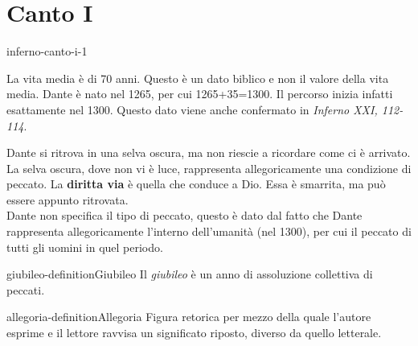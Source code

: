 \documentclass[preview]{standalone}
\begin{document}
\genpage

\section{Canto I}


\begin{snippet}{inferno-canto-i-1}

    La vita media è di 70 anni. Questo è un dato biblico e non il valore della vita media.
    Dante è nato nel 1265, per cui 1265+35=1300. Il percorso inizia infatti esattamente nel 1300.
    Questo dato viene anche confermato in \textit{Inferno XXI, 112-114}.

    Dante si ritrova in una selva oscura, ma non riescie a ricordare come ci è arrivato. 
    La selva oscura, dove non vi è luce, rappresenta allegoricamente una condizione di peccato.
    La \textbf{diritta via} è quella che conduce a Dio.
    Essa è smarrita, ma può essere appunto ritrovata.
    \\
    Dante non specifica il tipo di peccato, questo è dato dal fatto che Dante rappresenta allegoricamente
    l'interno dell'umanità (nel 1300), per cui il peccato di tutti gli uomini in quel periodo.
\end{snippet}

\begin{snippetdefinition}{giubileo-definition}{Giubileo}
    Il \textit{giubileo} è un anno di assoluzione collettiva di peccati.
\end{snippetdefinition}


\begin{snippetdefinition}{allegoria-definition}{Allegoria}
    Figura retorica per mezzo della quale l'autore esprime e il lettore ravvisa un significato riposto,
    diverso da quello letterale.
\end{snippetdefinition}
\end{document}
